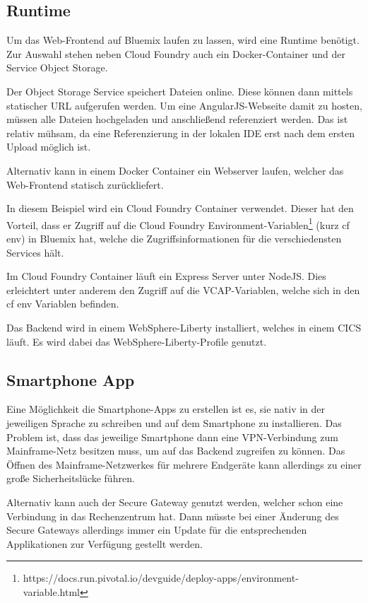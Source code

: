 \subsection{Runtime}
Um das Web-Frontend auf Bluemix laufen zu lassen, wird eine Runtime benötigt. Zur Auswahl stehen neben Cloud Foundry auch
ein Docker-Container und der Service Object Storage.

Der Object Storage Service speichert Dateien online. Diese können dann mittels statischer URL aufgerufen werden. Um eine
AngularJS-Webseite damit zu hosten, müssen alle Dateien hochgeladen und anschließend referenziert werden. Das
ist relativ mühsam, da eine Referenzierung in der lokalen IDE erst nach dem ersten Upload möglich ist.

Alternativ kann in einem Docker Container ein Webserver laufen, welcher das Web-Frontend statisch zurückliefert.

In diesem Beispiel wird ein Cloud Foundry Container verwendet. Dieser hat den Vorteil, dass er Zugriff auf die
Cloud Foundry Environment-Variablen\footnote{https://docs.run.pivotal.io/devguide/deploy-apps/environment-variable.html}
(kurz cf env) in Bluemix hat, welche die Zugriffsinformationen für die verschiedensten Services hält.

Im Cloud Foundry Container läuft ein Express Server unter NodeJS. Dies erleichtert unter anderem den Zugriff auf die
VCAP-Variablen, welche sich in den cf env Variablen befinden.

Das Backend wird in einem WebSphere-Liberty installiert, welches in einem CICS läuft. Es wird dabei das
WebSphere-Liberty-Profile genutzt.

\subsection{Smartphone App}
Eine Möglichkeit die Smartphone-Apps zu erstellen ist es, sie nativ in der jeweiligen Sprache zu schreiben und auf dem
Smartphone zu installieren. Das Problem ist, dass das jeweilige Smartphone dann eine VPN-Verbindung zum Mainframe-Netz
besitzen muss, um auf das Backend zugreifen zu können. Das Öffnen des Mainframe-Netzwerkes für mehrere Endgeräte kann
allerdings zu einer große Sicherheitslücke führen.

Alternativ kann auch der Secure Gateway genutzt werden, welcher schon eine Verbindung in das Rechenzentrum hat. Dann
müsste bei einer Änderung des Secure Gateways allerdings immer ein Update für die entsprechenden Applikationen zur
Verfügung gestellt werden.

